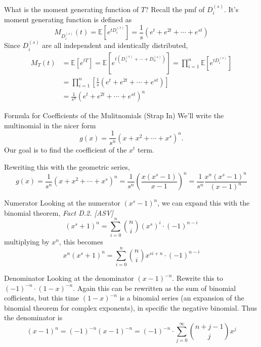 \documentclass{beamer}
\begin{document}
\begin{frame}{What is the moment generating function of $T$?}
    Recall the pmf of $D_{i}^{(s)}$. It's moment generating function is defined as
    $$
    M_{D_{i}^{(s)}}(t) = \mathbb{E}[e^{tD_{i}^{(s)}}] = \frac{1}{s}(e^{t} + e^{2t} + \cdots + e^{st})
    $$
    Since $D_{i}^{(s)}$ are all independent and identically distributed,
    \begin{align*}
        M_{T}(t) &= \mathbb{E}[e^{tT}] = \mathbb{E}[e^{t(D_{1}^{(s)} + \cdots + D_{n}^{(s)})}] = \prod_{i = 1}^{n} \mathbb{E}[e^{tD_{i}^{(s)}}] \\
        &= \prod_{i = 1}^{n} \left[\frac{1}{s}(e^{t} + e^{2t} + \cdots + e^{st}) \right] \\
        &= \frac{1}{s^n} (e^{t} + e^{2t} + \cdots + e^{st})^n
    \end{align*}
\end{frame}


\begin{frame}{Formula for Coefficients of the Mulitnomials (Strap In)}
    We'll write the multinomial in the nicer form 
    $$g(x) = \frac{1}{s^n}(x + x^2 + \cdots + x^s)^n.$$ 
    Our goal is to find the coefficient of the $x^t$ term. 

    Rewriting this with the geometric series, 
    $$
    g(x) = \frac{1}{s^n}(x + x^2 + \cdots + x^s)^n = \frac{1}{s^n} \left(\frac{x(x^s-1)}{x-1} \right)^n = \frac{1}{s^n} \frac{x^n(x^s-1)^n}{(x-1)^n}
    $$

\end{frame}

\begin{frame}{Numerator}
    Looking at the numerator $(x^s - 1)^n$, we can expand this with the binomial theorem, \textit{Fact D.2. [ASV]}
    $$
    (x^s+1)^n = \sum_{i = 0}^{n} \binom{n}{i} (x^s)^i \cdot (-1)^{n-i}
    $$
    multiplying by $x^n$, this becomes
    $$
    x^n(x^s+1)^n = \sum_{i = 0}^{n} \binom{n}{i} x^{si+n} \cdot (-1)^{n-i}
    $$ 
\end{frame}

\begin{frame}{Denominator}
    Looking at the denominator $(x-1)^{-n}$. Rewrite this to $(-1)^{-n} \cdot (1-x)^{-n}$. Again this can be rewritten as the sum of binomial cofficients, but this time $(1-x)^{-n}$ is a binomial series (an expansion of the binomial theorem for complex exponents), in specific the negative binomial. Thus the denominator is 
    $$ 
    (x-1)^n = (-1)^{-n} (x-1)^{-n} = (-1)^{-n} \cdot\sum_{j = 0}^{\infty}\binom{n+j-1}{j} x^j 
    $$
\end{frame}
\end{document}
